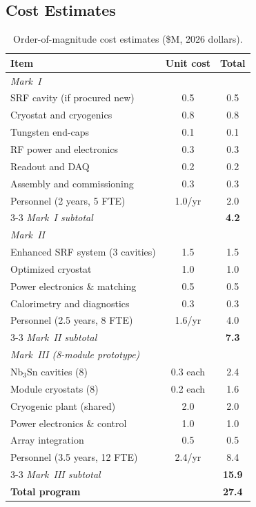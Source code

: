 \documentclass[11pt,a4paper]{article}
\begin{document}
\subsection{Cost Estimates}

\begin{table}[h]
\centering
\caption{Order-of-magnitude cost estimates (\$M, 2026 dollars).}
\label{tab:costs}
\begin{tabular}{@{}lcc@{}}
\toprule
Item & Unit cost & Total \\
\midrule
\multicolumn{3}{l}{\textit{Mark~I}} \\
SRF cavity (if procured new) & 0.5 & 0.5 \\
Cryostat and cryogenics & 0.8 & 0.8 \\
Tungsten end-caps & 0.1 & 0.1 \\
RF power and electronics & 0.3 & 0.3 \\
Readout and DAQ & 0.2 & 0.2 \\
Assembly and commissioning & 0.3 & 0.3 \\
Personnel (2 years, 5 FTE) & 1.0/yr & 2.0 \\
\cmidrule{3-3}
\textit{Mark~I subtotal} & & \textbf{4.2} \\
\midrule
\multicolumn{3}{l}{\textit{Mark~II}} \\
Enhanced SRF system (3 cavities) & 1.5 & 1.5 \\
Optimized cryostat & 1.0 & 1.0 \\
Power electronics \& matching & 0.5 & 0.5 \\
Calorimetry and diagnostics & 0.3 & 0.3 \\
Personnel (2.5 years, 8 FTE) & 1.6/yr & 4.0 \\
\cmidrule{3-3}
\textit{Mark~II subtotal} & & \textbf{7.3} \\
\midrule
\multicolumn{3}{l}{\textit{Mark~III (8-module prototype)}} \\
Nb$_3$Sn cavities (8) & 0.3 each & 2.4 \\
Module cryostats (8) & 0.2 each & 1.6 \\
Cryogenic plant (shared) & 2.0 & 2.0 \\
Power electronics \& control & 1.0 & 1.0 \\
Array integration & 0.5 & 0.5 \\
Personnel (3.5 years, 12 FTE) & 2.4/yr & 8.4 \\
\cmidrule{3-3}
\textit{Mark~III subtotal} & & \textbf{15.9} \\
\midrule
\textbf{Total program} & & \textbf{27.4} \\
\bottomrule
\end{tabular}
\end{table}
\end{document}
